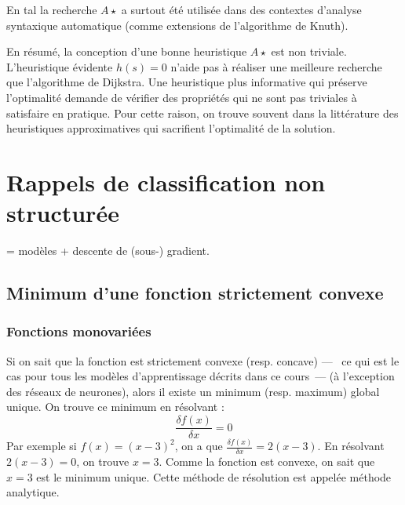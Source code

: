 \documentclass[11pt,openany]{book}
\newcommand{\ac}[1]{{\sc #1}} %
\begin{document}
En \ac{tal} la recherche $A\star$ a surtout été utilisée dans des
contextes d'analyse syntaxique automatique (comme extensions de
l'algorithme de Knuth).

En résumé, la conception d'une bonne heuristique $A\star$ est non
triviale. L'heuristique évidente $h(s) = 0$ n'aide pas à réaliser une
meilleure recherche que l'algorithme de Dijkstra. Une heuristique plus informative qui préserve
l'optimalité demande de vérifier des propriétés qui ne sont pas
triviales à satisfaire en pratique. Pour cette raison, on trouve
souvent dans la littérature des heuristiques approximatives qui sacrifient l'optimalité de la solution.


\chapter{Rappels de classification non structurée}

= modèles + descente de (sous-) gradient.

\section{Minimum d'une fonction strictement convexe}


\subsection{Fonctions monovariées}


Si on sait que la fonction est strictement convexe (resp. concave) ---~
 ce qui est le cas pour tous les modèles d'apprentissage décrits dans
 ce cours~--- (à l'exception des réseaux de neurones), alors il existe
 un minimum (resp. maximum) global unique.
On trouve ce minimum en résolvant :
\begin{equation}
\label{eq-derivative}
\frac{\delta f(x)}{\delta x} = 0 
\end{equation}
Par exemple si $f(x) = (x-3)^2$, on a que $\frac{\delta f(x)}{\delta
  x} = 2(x-3)$. En résolvant $2(x-3) = 0$, on trouve $x=3$. Comme la
fonction est convexe, on sait que $x=3$ est le minimum unique.
Cette méthode de résolution est appelée méthode analytique.
\end{document}
